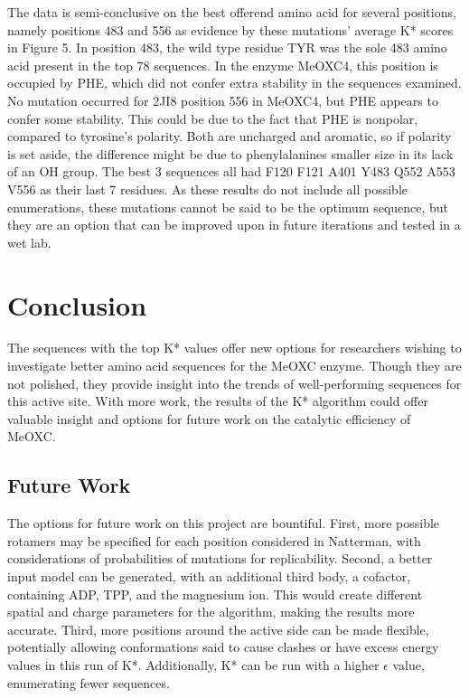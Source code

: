 \documentclass[12pt]{extarticle}
\begin{document}
\indent The data is semi-conclusive on the best offerend amino acid for several positions, namely positions 483 and 556 as evidence by these mutations' average K* scores in Figure 5. In position 483, the wild type residue TYR was the sole 483 amino acid present in the top 78 sequences. In the enzyme MeOXC4, this position is occupied by PHE, which did not confer extra stability in the sequences examined. No mutation occurred for 2JI8 position 556 in MeOXC4, but PHE appears to confer some stability. This could be due to the fact that  PHE is nonpolar, compared to tyrosine's polarity. Both are uncharged and aromatic, so if polarity is set aside, the difference might be due to phenylalanines smaller size in its lack of an OH group. The best 3 sequences all had F120 F121 A401 Y483 Q552 A553 V556 as their last 7 residues. As these results do not include all possible enumerations, these mutations cannot be said to be the optimum sequence, but they are an option that can be improved upon in future iterations and tested in a wet lab.
\section{Conclusion}
The sequences with the top K* values offer new options for researchers wishing to investigate better amino acid sequences for the MeOXC enzyme. Though they are not polished, they provide insight into the trends of well-performing sequences for this active site. With more work, the results of the K* algorithm could offer valuable insight and options for future work on the catalytic efficiency of MeOXC.
\subsection{Future Work}
The options for future work on this project are bountiful. First, more possible rotamers may be specified for each position considered in {Natterman}, with considerations of probabilities of mutations for replicability. Second, a better input model can be generated, with an additional third body, a cofactor, containing ADP, TPP, and the magnesium ion. This would create different spatial and charge parameters for the algorithm, making the results more accurate. Third, more positions around the active side can be made flexible, potentially allowing conformations said to cause clashes or have excess energy values in this run of K*. Additionally, K* can be run with a higher $\epsilon$ value, enumerating fewer sequences.
\end{document}
